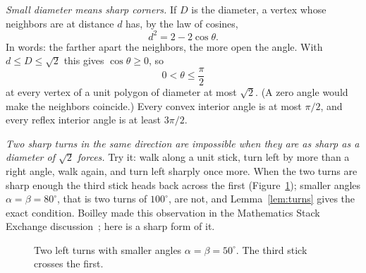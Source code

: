 \documentclass[11pt]{article}
\theoremstyle{remark}
\begin{document}
\emph{Small diameter means sharp corners.} If $D$ is the diameter, a vertex whose
neighbors are at distance $d$ has, by the law of cosines,
\begin{equation}\label{eq:cosine}
  d^2 = 2-2\cos\theta .
\end{equation}
In words: the farther apart the neighbors, the more open the angle. With
$d\le D\le\sqrt2$ this gives $\cos\theta\ge0$, so
\begin{equation}\label{eq:angles}
  0<\theta\le\frac{\pi}{2}
\end{equation}
at every vertex of a unit polygon of diameter at most $\sqrt2$. (A zero angle would make
the neighbors coincide.) Every convex interior angle is at most $\pi/2$, and every reflex
interior angle is at least $3\pi/2$.

\emph{Two sharp turns in the same direction are impossible when they are as sharp as a diameter of $\sqrt2$ forces.} Try it: walk along a unit
stick, turn left by more than a right angle, walk again, and turn left sharply once more.
When the two turns are sharp enough the third stick heads back across the first
(Figure~\ref{fig:turns}); smaller angles $\alpha=\beta=80^\circ$, that is two turns of $100^\circ$, are not, and Lemma~\ref{lem:turns} gives
the exact condition. Boilley made this
observation in the Mathematics Stack Exchange discussion~\cite{Boilley}; here is a sharp
form of it.

\begin{figure}[ht]
\centering
{}
\caption{Two left turns with smaller angles $\alpha=\beta=50^\circ$. The third stick
crosses the first.}
\label{fig:turns}
\end{figure}
\end{document}
